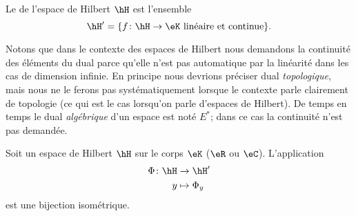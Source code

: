 \begin{definition}
	Le  de l'espace de Hilbert \( \hH\) est l'ensemble
	\begin{equation}
		\hH'=\{ f\colon \hH\to \eK\text{ linéaire et continue} \}.
	\end{equation}
\end{definition}
Notons que dans le contexte des espaces de Hilbert nous demandons la continuité des éléments du dual parce qu'elle n'est pas automatique par la linéarité dans les cas de dimension infinie. En principe nous devrions préciser dual \emph{topologique}, mais nous ne le ferons pas systématiquement lorsque le contexte parle clairement de topologie (ce qui est le cas lorsqu'on parle d'espaces de Hilbert). De temps en temps le dual \emph{algébrique} d'un espace est noté \( E^*\); dans ce cas la continuité n'est pas demandée.

\begin{theorem}        \label{ThoQgTovL}
	Soit un espace de Hilbert \( \hH\) sur le corps \( \eK\) (\( \eR\) ou \( \eC\)). L'application
	\begin{equation}
		\begin{aligned}
			\Phi\colon \hH & \to \hH'       \\
			y              & \mapsto \Phi_y
		\end{aligned}
	\end{equation}
	est une bijection isométrique.
\end{theorem}

